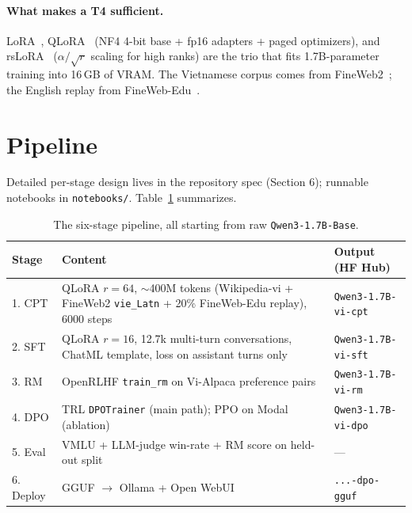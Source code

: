 \documentclass[10pt,twocolumn]{article}
\begin{document}
\paragraph{What makes a T4 sufficient.}
LoRA~\citep{hu2021lora}, QLoRA~\citep{dettmers2023qlora} (NF4 4-bit base + fp16 adapters + paged optimizers), and rsLoRA~\citep{kalajdzievski2023rslora} ($\alpha/\sqrt{r}$ scaling for high ranks) are the trio that fits 1.7B-parameter training into 16\,GB of VRAM. The Vietnamese corpus comes from FineWeb2~\citep{penedo2025fineweb2}; the English replay from FineWeb-Edu~\citep{penedo2024fineweb}.

\section{Pipeline}
\label{sec:pipeline}

Detailed per-stage design lives in the repository spec (Section 6); runnable notebooks in \texttt{notebooks/}. Table~\ref{tab:pipeline} summarizes.

\begin{table}[t]
\centering\small
\caption{The six-stage pipeline, all starting from raw \texttt{Qwen3-1.7B-Base}.}
\label{tab:pipeline}
\begin{tabularx}{\textwidth}{@{}lXl@{}}
\toprule
\textbf{Stage} & \textbf{Content} & \textbf{Output (HF Hub)} \\
\midrule
1. CPT & QLoRA $r{=}64$, $\sim$400M tokens (Wikipedia-vi + FineWeb2 \texttt{vie\_Latn} + 20\% FineWeb-Edu replay), 6000 steps & \texttt{Qwen3-1.7B-vi-cpt} \\
2. SFT & QLoRA $r{=}16$, 12.7k multi-turn conversations, ChatML template, loss on assistant turns only & \texttt{Qwen3-1.7B-vi-sft} \\
3. RM & OpenRLHF \texttt{train\_rm} on Vi-Alpaca preference pairs & \texttt{Qwen3-1.7B-vi-rm} \\
4. DPO & TRL \texttt{DPOTrainer} (main path); PPO on Modal (ablation) & \texttt{Qwen3-1.7B-vi-dpo} \\
5. Eval & VMLU + LLM-judge win-rate + RM score on held-out split & --- \\
6. Deploy & GGUF $\to$ Ollama + Open WebUI & \texttt{...-dpo-gguf} \\
\bottomrule
\end{tabularx}
\end{table}
\end{document}

